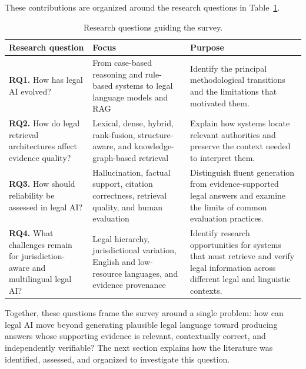 These contributions are organized around the research questions in Table~\ref{tab:rq}.

\begin{table}[t]
\centering
\caption{Research questions guiding the survey.}
\label{tab:rq}
\footnotesize
\setlength{\tabcolsep}{5pt}
\renewcommand{\arraystretch}{1.3}
\begin{tabularx}{\textwidth}{>{\raggedright\arraybackslash}p{4.0cm} >{\raggedright\arraybackslash}X >{\raggedright\arraybackslash}X}
\toprule
\textbf{Research question} & \textbf{Focus} & \textbf{Purpose} \\
\midrule
\textbf{RQ1.} How has legal AI evolved? & From case-based reasoning and rule-based systems to legal language models and RAG & Identify the principal methodological transitions and the limitations that motivated them. \\
\textbf{RQ2.} How do legal retrieval architectures affect evidence quality? & Lexical, dense, hybrid, rank-fusion, structure-aware, and knowledge-graph-based retrieval & Explain how systems locate relevant authorities and preserve the context needed to interpret them. \\
\textbf{RQ3.} How should reliability be assessed in legal AI? & Hallucination, factual support, citation correctness, retrieval quality, and human evaluation & Distinguish fluent generation from evidence-supported legal answers and examine the limits of common evaluation practices. \\
\textbf{RQ4.} What challenges remain for jurisdiction-aware and multilingual legal AI? & Legal hierarchy, jurisdictional variation, English and low-resource languages, and evidence provenance & Identify research opportunities for systems that must retrieve and verify legal information across different legal and linguistic contexts. \\
\bottomrule
\end{tabularx}
\end{table}

Together, these questions frame the survey around a single problem: how can legal AI move beyond
generating plausible legal language toward producing answers whose supporting evidence is
relevant, contextually correct, and independently verifiable? The next section explains how the
literature was identified, assessed, and organized to investigate this question.
